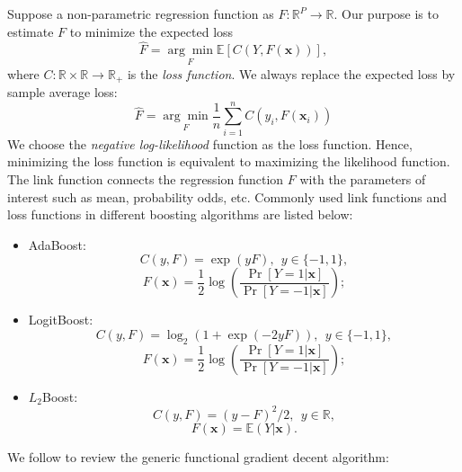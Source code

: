 \documentclass[11pt]{article}
\numberwithin{equation}{section}
\def\R{{\mathbb R}}  %
\def\E{{\mathbb E}}  %
\def\bx{\boldsymbol{x}}
\begin{document}
	Suppose a {non-parametric regression function} as $F:\R^P\rightarrow\R$. Our purpose is to  estimate $F$ to minimize the expected loss $$\hat{F}=\underset{F}{\arg\min}\E\left[C(Y,F(\bx))\right],$$
	where $C:\R\times\R\rightarrow\R_+$ is the \textit{loss function}.
	We always replace the expected loss by sample average loss:
	$$\hat{F}=\underset{F}{\arg\min} \frac{1}{n}\sum_{i=1}^nC(y_i,F(\bx_i))$$
	We choose the \textit{negative log-likelihood} function as the loss function. Hence, minimizing the loss function is equivalent to maximizing the likelihood function.
The link function connects the regression function $F$ with the parameters of interest such as mean, probability odds, etc. 
	Commonly used {link functions} and loss functions in different boosting algorithms are listed below:
	\begin{itemize}
		\item AdaBoost: $$C(y,F)=\exp(yF),  ~~ y\in\{-1,1\},$$
		$$F(\bx)=\frac{1}{2}\log\left(\frac{\Pr[Y=1|\bx]}{\Pr[Y=-1|\bx]}\right);$$
		\item LogitBoost: $$C(y,F)=\log_2(1+\exp(-2yF)), ~~ y\in\{-1,1\},$$
		$$F(\bx)=\frac{1}{2}\log\left(\frac{\Pr[Y=1|\bx]}{\Pr[Y=-1|\bx]}\right);$$
		\item $L_2$Boost: 
		\begin{equation}\label{l2}
			C(y,F)=(y-F)^2/2, ~~ y\in \R,
		\end{equation}
		$$F(\bx)=\E(Y|\bx).$$
	\end{itemize}

We follow \citet{buehlmann:2003} to review the generic functional gradient decent algorithm:
\end{document}
